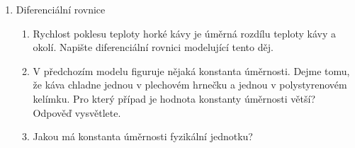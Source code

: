 \documentclass[12pt]{article}
\begin{document}
\begin{enumerate}
  
\item Diferenciální rovnice
  \begin{enumerate}
  \item Rychlost poklesu teploty horké kávy je úměrná rozdílu teploty
    kávy a okolí. Napište diferenciální rovnici modelující tento děj.
  \item V předchozím modelu figuruje nějaká konstanta úměrnosti. Dejme
    tomu, že káva chladne jednou v plechovém hrnečku a jednou v
    polystyrenovém kelímku. Pro který případ je hodnota konstanty
    úměrnosti větší? Odpověď vysvětlete.
  \item Jakou má konstanta úměrnosti fyzikální jednotku?
\end{enumerate}


  
\end{enumerate}
\end{document}
